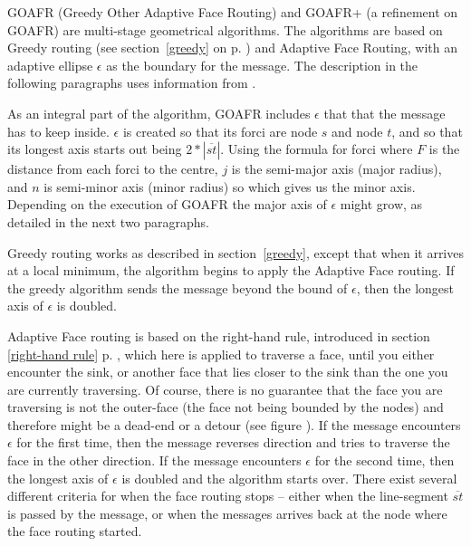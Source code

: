 GOAFR \cite{gopher} (Greedy Other Adaptive Face Routing) and GOAFR+ \cite{gopher+} (a refinement on GOAFR) are multi-stage geometrical algorithms. The algorithms are based on Greedy routing (see section~\ref{greedy} on p. \pageref{greedy}) and Adaptive Face Routing, with an adaptive ellipse $\epsilon$ as the boundary for the message. The description in the following paragraphs uses information from \cite{gopher}.

As an integral part of the algorithm, GOAFR includes $\epsilon$ that that the message has to keep inside. $\epsilon$ is created so that its forci are node $s$ and node $t$, and so that its longest axis starts out being $2 * |\overline{st}|$. Using the formula for forci
where $F$ is the distance from each forci to the centre, $j$ is the semi-major axis (major radius), and $n$ is semi-minor axis (minor radius) so
which gives us the minor axis. Depending on the execution of GOAFR the major axis of $\epsilon$ might grow, as detailed in the next two paragraphs.

Greedy routing works as described in section~\ref{greedy}, except that when it arrives at a local minimum, the algorithm begins to apply the Adaptive Face routing. If the greedy algorithm sends the message beyond the bound of $\epsilon$, then the longest axis of $\epsilon$ is doubled.

Adaptive Face routing is based on the right-hand rule, introduced in section \ref{right-hand rule} p. \pageref{right-hand rule}, which here is applied to traverse a face, until you either encounter the sink, or another face that lies closer to the sink than the one you are currently traversing. Of course, there is no guarantee that the face you are traversing is not the outer-face (the face not being bounded by the nodes) and therefore might be a dead-end or a detour (see figure ). If the message encounters $\epsilon$ for the first time, then the message reverses direction and tries to traverse the face in the other direction. If the message encounters $\epsilon$ for the second time, then the longest axis of $\epsilon$ is doubled and the algorithm starts over. There exist several different criteria for when the face routing stops -- either when the line-segment $\overline{st}$ is passed by the message, or when the messages arrives back at the node where the face routing started.

